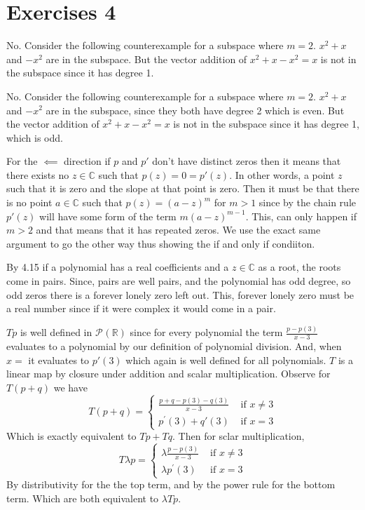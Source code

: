 \documentclass[10pt, twocolumn]{article}
\newcommand{\C}{\mathbb{C}}
\newcommand{\R}{\mathbb{R}}
\newcommand{\poly}[2]{\mathcal{P}_{#1}\left(#2\right)}
\begin{document}
\section{Exercises 4}
\begin{q}[2]
    No. Consider the following counterexample for a subspace where $ m = 2 $.
    $ x^2 + x $ and $ -x^2 $ are in the subspace. 
    But the vector addition of $ x^2 + x - x^2 = x $ is not in the subspace since it has degree 1.
\end{q}
\begin{q}[3]
    No. Consider the following counterexample for a subspace where $ m = 2 $.
    $ x^2 + x $ and $ -x^2 $ are in the subspace, since they both have degree 2 which is even. 
    But the vector addition of $ x^2 + x - x^2 = x $ is not in the subspace since it has degree 1, which is odd.
\end{q}
\begin{q}[6]
    For the $ \impliedby $ direction if $ p $ and $ p' $ don't have distinct zeros then it means that there exists no $ z \in \C $ such that $ p(z) = 0 = p'(z) $.
    In other words, a point $ z $ such that it is zero and the slope at that point is zero. 
    Then it must be that there is no point $ a \in \C $ such that $ p(z) = (a-z)^m $ for  $ m > 1 $ since by the chain rule $ p'(z) $ will have some form of the term $ m(a-z)^{m-1} $. 
    This, can only happen if $ m > 2 $ and that means that it has repeated zeros. We use the exact same argument to go the other way thus showing the if and only if condiiton. 
\end{q}
\begin{q}[7]
    By 4.15 if a polynomial has a real coefficients and a $ z \in \C $ as a root, the roots come in pairs.
    Since, pairs are well pairs, and the polynomial has odd degree, so odd zeros there is a forever lonely zero left out. 
    This, forever lonely zero must be a real number since if it were complex it would come in a pair. 
\end{q}
\begin{q}[8]
    $ Tp $ is well defined in $ \poly{}{\R} $ since for every polynomial the term $\frac{p-p(3)}{x-3}$ evaluates to a polynomial by our definition of polynomial division. 
    And, when $ x = $ it evaluates to $ p'(3) $ which again is well defined for all polynomials.
    $ T $ is a linear map by closure under addition and scalar multiplication. 
    Observe for $ T(p + q) $ we have 
    $$T (p + q)=\left\{\begin{array}{ll}\frac{p + q -p(3) - q(3)}{x-3} & \text { if } x \neq 3 \\ p^{\prime}(3) + q'(3) & \text { if } x=3\end{array}\right.$$
    Which is exactly equivalent to $ Tp + Tq $. 
    Then for sclar multiplication, 
    $$T \lambda p=\left\{\begin{array}{ll} \lambda \frac{p-p(3)}{x-3} & \text { if } x \neq 3 \\ \lambda p^{\prime}(3) & \text { if } x=3\end{array}\right.$$
    By distributivity for the the top term, and by the power rule for the bottom term. Which are both equivalent to $ \lambda Tp $.
\end{q}
\end{document}
